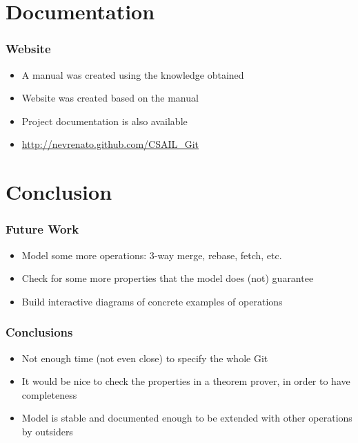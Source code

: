 \documentclass{beamer}
\begin{document}
\section{Documentation}

\begin{frame}
	\frametitle{Website}
	\begin{itemize}
	\item A manual was created using the knowledge obtained
	\item Website was created based on the manual 
	\item Project documentation is also available
	\item \url{http://nevrenato.github.com/CSAIL\_Git}
	\end{itemize}

\end{frame}

\section{Conclusion}

\begin{frame}
	\frametitle{Future Work}
	\begin{itemize}
	\item Model some more operations: 3-way merge, rebase, fetch, etc. 
	\item Check for some more properties that the model does (not) guarantee
	\item Build interactive diagrams of concrete examples of operations 
	\end{itemize}
\end{frame}

\begin{frame}
	\frametitle{Conclusions}
	\begin{itemize}
	\item Not enough time (not even close) to specify the whole Git
	\item It would be nice to check the properties in a theorem prover, in
	order to have completeness
	\item Model is stable and documented enough to be extended with other operations by outsiders
	\end{itemize}
\end{frame}
\end{document}
